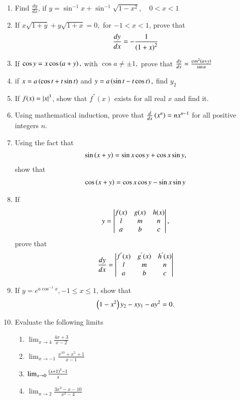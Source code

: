 \begin{enumerate}[label=\arabic*.,ref=\thesubsection.\theenumi]
\item Find $\frac{dy}{dx}$, if 
$
y = \sin ^{-1}x + \sin^{-1}\sqrt{1-x^2}, \quad 0 < x < 1
$
\item If 
$
x\sqrt{1+y}+y\sqrt{1+x} = 0,
$
for $-1<x<1$, prove that
%
\begin{align}
\frac{dy}{dx} = -\frac{1}{\left(1+x\right)^2}
\end{align}
\item If
$
\cos y = x \cos\left(a+y\right), 
$
with 
$
\cos a \ne \pm 1,
$
prove that 
$
\frac{dy}{dx}= \frac{\cos^2\left(a+y\right)}{\sin a}
$
\item if 
$
x = a \left(\cos t + t\sin t\right)
$
and
$
y = a \left(\sin t - t\cos t \right), 
$
find $y_2$
\item If $f(x) =\left\vert x\right\vert^3$, show that $f^{''}(x)$ exists for all real $x$ and find it.
\item Using mathematical induction, prove that $\frac{d}{dx}\left(x^n\right) = nx^{n-1}$ for all positive integers $n$.
\item Using the fact that 
\begin{align}
\sin\left(x+y\right) = \sin x \cos y +\cos x \sin y,
\end{align}
%
show that 
\begin{align}
\cos\left(x+y\right) = \cos x \cos y -\sin x \sin y
\end{align}
\item If 
\begin{align}
y = 
\begin{vmatrix}
f(x) & g(x) & h(x)
\\
l &m & n
\\
a & b & c
\end{vmatrix},
\end{align}
%
prove that 
\begin{align}
\frac{dy}{dx} = 
\begin{vmatrix}
f^{'}(x) & g^{'}(x) & h^{'}(x)
\\
l &m & n
\\
a & b & c
\end{vmatrix}
\end{align}
\item If $y = e^{a\cos^{-1}x}, - 1 \le x \le 1$, show that 
\begin{align}
\left(1-x^2\right)y_2-xy_1-ay^2 = 0.
\end{align}
%
\item Evaluate the following limits
%
\begin{enumerate}
\item  $\lim_{x\to 4} \frac{4x+3}{x-2}$
\item  $\lim_{x\to -1} \frac{x^10+x^5+1}{x-1}$
\item  $\lim_{x\to 0} \frac{\left(x+1\right)^5-1}{x}$
\item  $\lim_{x\to 2} \frac{3x^2-x-10}{x^2-4}$

\end{enumerate}
\end{enumerate}
